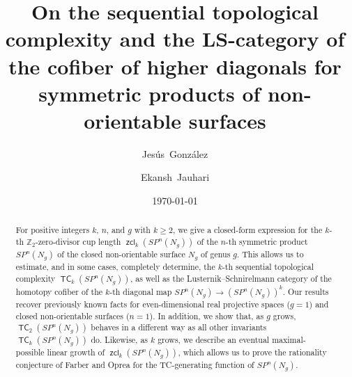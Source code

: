 \documentclass[amscd,amssymb,verbatim,10pt]{amsart}
\date{\today}
\numberwithin{equation}{section}
\theoremstyle{plain}
\theoremstyle{definition}
\DeclareMathOperator{\TC}{{\mathsf{TC}}}
\DeclareMathOperator{\zcl}{{\mathsf{zcl}}}
\begin{document}
\begin{abstract}
For positive integers $k$, $n$, and $g$ with $k\geq2$, we give a closed-form expression for the $k$-th $\mathbb{Z}_2$-zero-divisor cup length $\zcl_k(SP^n(N_g))$ of the $n$-th symmetric product $SP^n(N_g)$ of the closed non-orientable surface $N_g$ of genus $g$. This allows us to estimate, and in some cases, completely determine, the $k$-th sequential topological complexity $\TC_k(SP^n(N_g))$, as well as the Lusternik--Schnirelmann category of the homotopy cofiber of the $k$-th diagonal map $SP^n(N_g) \to (SP^n(N_g))^k$. Our results recover previously known facts for even-dimensional real projective spaces ($g=1$) and closed non-orientable surfaces ($n=1$). In addition, we show that, as $g$ grows, $\TC_2(SP^n(N_g))$ behaves in a different way as all other invariants $\TC_k(SP^n(N_g))$ do. Likewise, as $k$ grows, we describe an eventual maximal-possible linear growth of $\zcl_k(SP^n(N_g))$, which allows us to prove the rationality conjecture of Farber and Oprea for the TC-generating function of $SP^n(N_g)$.
\end{abstract}

\title[Symmetric products of non-orientable surfaces]{On the sequential topological complexity and the LS-category of the cofiber of higher diagonals for symmetric products of non-orientable surfaces}



\author[J.~Gonz\'alez]{Jes\'us~Gonz\'alez}

\author[E.~Jauhari]{Ekansh~Jauhari}

\address{Jes\'us~Gonz\'alez, Departamento de Matem\'aticas, Centro de Investigaci\' on y de Estudios Avanzados del IPN, Av. Instituto Polit\'ecnico Nacional 2508, San Pedro Zacatenco, Ciudad de M\'exico, 07000.}


\address{Ekansh Jauhari, Department of Mathematics, University of Florida, 358 Little Hall, Gainesville, FL 32611, USA.}



\end{document}
